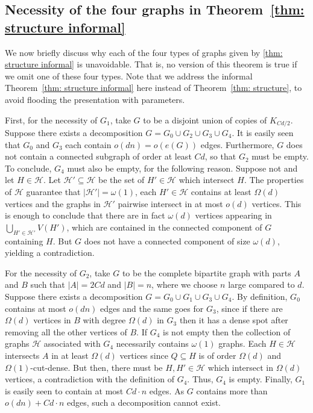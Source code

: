 \documentclass[10pt]{article}
\theoremstyle{definition}
\begin{document}
\subsection{Necessity of the four graphs in Theorem~\ref{thm: structure informal}}\label{sec:necessity}
We now briefly discuss why each of the four types of graphs given by \cref{thm: structure informal} is unavoidable. That is, no version of this theorem is true if we omit one of these four types. Note that we address the informal Theorem~\ref{thm: structure informal} here instead of Theorem~\ref{thm: structure}, to avoid flooding the presentation with parameters.

First, for the necessity of $G_1$, take $G$ to be a disjoint union of copies of $K_{Cd/2}$. Suppose there exists a decomposition $G=G_0\cup G_2\cup G_3 \cup G_4$. It is easily seen that $G_0$ and $G_3$ each contain $o(dn)=o(e(G))$ edges. Furthermore, $G$ does not contain a connected subgraph of order at least $Cd$, so that $G_2$ must be empty. To conclude, $G_4$ must also be empty, for the following reason. Suppose not and let $H\in\mathcal H$. Let $\mathcal H'\subseteq \mathcal H$ be the set of $H'\in\mathcal H$ which intersect $H$. The properties of $\mathcal H$ guarantee that $|\mathcal H'|=\omega(1)$, each $H'\in \mathcal H$ contains at least $\Omega(d)$ vertices and the graphs in $\mathcal H'$ pairwise intersect in at most $o(d)$ vertices. This is enough to conclude that there are in fact $\omega(d)$ vertices appearing in $\bigcup_{H'\in\mathcal H'}V(H')$, which are contained in the connected component of $G$ containing $H$. But $G$ does not have a connected component of size $\omega(d)$, yielding a contradiction.

For the necessity of $G_2$, take $G$ to be the complete bipartite graph with parts $A$ and $B$ such that $|A|=2Cd$ and $|B|=n$, where we choose $n$ large compared to $d$. Suppose there exists a decomposition $G=G_0\cup G_1\cup G_3\cup G_4$. By definition, $G_0$ contains at most $o(dn)$ edges and the same goes for $G_3$, since if there are $\Omega(d)$ vertices in $B$ with degree $\Omega(d)$ in $G_3$ then it has a dense spot after removing all the other vertices of $B$. If $G_4$ is not empty then the collection of graphs $\mathcal H$ associated with $G_4$ necessarily contains $\omega(1)$ graphs. Each $H\in\mathcal H$ intersects $A$ in at least $\Omega(d)$ vertices since $Q\subseteq H$ is of order $\Omega(d)$ and $\Omega(1)$-cut-dense. But then, there must be $H,H'\in\mathcal H$ which intersect in $\Omega(d)$ vertices, a contradiction with the definition of $G_4$. Thus, $G_4$ is empty. Finally, $G_1$ is easily seen to contain at most $Cd\cdot n$ edges. As $G$ contains more than $o(dn)+Cd\cdot n$ edges, such a decomposition cannot exist. 
\end{document}
